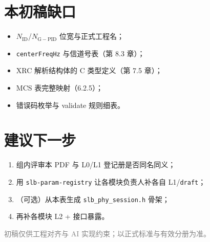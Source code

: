 \documentclass[11pt,a4paper]{ctexart}
\begin{document}
\section{本初稿缺口}

\begin{itemize}[nosep]
  \item $N_{\mathrm{ID}}$/$N_{\mathrm{G-PID}}$ 位宽与正式工程名；
  \item \texttt{centerFreqHz} 与信道号表（第 8.3 章）；
  \item XRC 解析结构体的 C 类型定义（第 7.5 章）；
  \item MCS 表完整映射（6.2.5）；
  \item 错误码枚举与 validate 规则细表。
\end{itemize}

\section{建议下一步}

\begin{enumerate}[nosep]
  \item 组内评审本 PDF 与 L0/L1 登记册是否同名同义；
  \item 用 \texttt{slb-param-registry} 让各模块负责人补各自 L1/\texttt{draft}；
  \item （可选）从本表生成 \texttt{slb\_phy\_session.h} 骨架；
  \item 再补各模块 L2 + 接口暴露。
\end{enumerate}

\vspace{1.2em}
{\small\textcolor{gray}{初稿仅供工程对齐与 AI 实现约束；以正式标准与有效分册为准。}}
\end{document}
